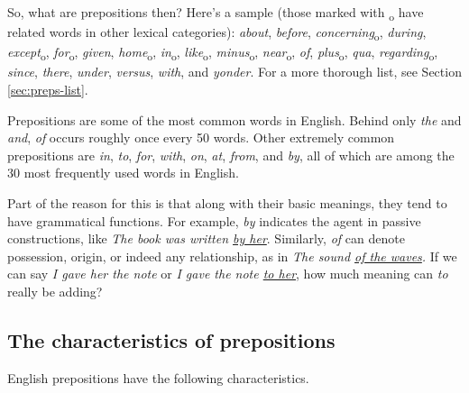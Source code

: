 So, what are prepositions then? Here's a sample (those marked with \textsubscript{o} have related words in other lexical categories):
\textit{about}, \textit{before}, \textit{concerning}\textsubscript{o}, \textit{during}, \textit{except}\textsubscript{o}, \textit{for}\textsubscript{o}, \textit{given}, \textit{home}\textsubscript{o}, \textit{in}\textsubscript{o}, \textit{like}\textsubscript{o}, \textit{minus}\textsubscript{o}, \textit{near}\textsubscript{o}, \textit{of}, \textit{plus}\textsubscript{o}, \textit{qua}, \textit{regarding}\textsubscript{o}, \textit{since}, \textit{there}, \textit{under}, \textit{versus}, \textit{with}, and \textit{yonder}. For a more thorough list, see Section \ref{sec:preps-list}.


Prepositions are some of the most common words in English. Behind only \textit{the} and \textit{and}, \textit{of} occurs roughly once every 50 words. Other extremely common prepositions are \textit{in}, \textit{to}, \textit{for}, \textit{with}, \textit{on}, \textit{at}, \textit{from}, and \textit{by}, all of which are among the 30 most frequently used words in English. 

Part of the reason for this is that along with their basic meanings, they tend to have grammatical functions. For example, \textit{by} indicates the agent in passive constructions, like \textit{The book was written \uline {by her}}. Similarly, \textit{of} can denote possession, origin, or indeed any relationship, as in \textit{The sound \uline {of the waves}.} If we can say \textit{I gave her the note} or \textit{I gave the note \uline {to her}}, how much meaning can \textit{to} really be adding?

\subsection{The characteristics of prepositions}\label{sec:preps}

English prepositions have the following characteristics.

